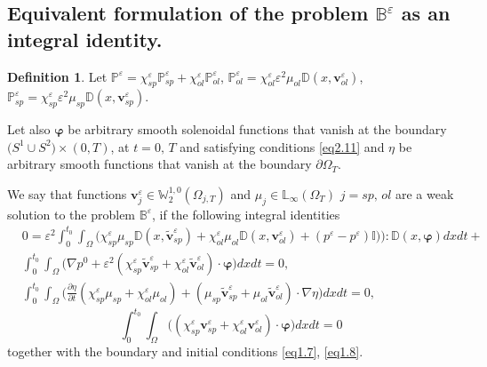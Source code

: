 \documentclass{article}
\theoremstyle{plain}
\theoremstyle{definition}
\newtheorem{definition}[theorem]{Definition}
\numberwithin{equation}{section}
\begin{document}
\subsection{Equivalent formulation of the problem $\mathbb{B}^{\varepsilon}$ as an integral identity.}

\begin{definition}\label{d2.14}
Let $\mathbb{P}^{\varepsilon}=\chi^{\varepsilon}_{sp}\mathbb{P}^{\varepsilon}_{sp}+
\chi^{\varepsilon}_{ol}\mathbb{P}^{\varepsilon}_{ol}$,
$\mathbb{P}^{\varepsilon}_{ol}=\chi^{\varepsilon}_{ol}\varepsilon^{2}\mu_{ol}
\mathbb{D}(x,\boldsymbol{v}^{\varepsilon}_{ol})$,
$\mathbb{P}^{\varepsilon}_{sp}=\chi^{\varepsilon}_{sp}\varepsilon^{2}\mu_{sp}
\mathbb{D}(x,\boldsymbol{v}^{\varepsilon}_{sp})$. 

Let also $\boldsymbol{\varphi}$ be arbitrary
smooth solenoidal functions that vanish at the boundary $\big(S^{1}\cup S^{2}\big)\times(0,T)$,
at $t=0,\,T$ and satisfying conditions \eqref{eq2.11} and $\eta$ be arbitrary smooth functions that
vanish at the boundary $\partial\Omega_{T}$.

We say that functions $\boldsymbol{v}^{\varepsilon}_{j}\in\mathbb{W}^{1,0}_{2}(\Omega_{j,T})$ 
and $\mu_{j}\in\mathbb{L}_{\infty}(\Omega_{T})\,\,j=sp,\,ol$ are a weak solution to the problem $\mathbb{B}^{\varepsilon}$, if the following integral identities
\begin{equation}\label{eq2.18}
\begin{aligned}
&
0=\varepsilon^{2}\int_{0}^{t_{0}}\int_{\Omega}\big(\chi^{\varepsilon}_{sp}\mu_{sp}
\mathbb{D}(x,\widetilde{\boldsymbol{v}}^{\varepsilon}_{sp})+
\chi^{\varepsilon}_{ol}\mu_{ol}\mathbb{D}(x,\boldsymbol{v}^{\varepsilon}_{ol})+
({p}^{\varepsilon}-{p}^{\varepsilon})\mathbb{I})\big):\mathbb{D}(x,\boldsymbol{\varphi})dxdt+
\\
& \int_{0}^{t_{0}}\int_{\Omega}\big(\nabla{p}^{0}+\varepsilon^{2}(\chi^{\varepsilon}_{sp}
\widetilde{\boldsymbol{v}}^{\varepsilon}_{sp}+\chi^{\varepsilon}_{ol}
\widetilde{\boldsymbol{v}}^{\varepsilon}_{ol})\cdot\boldsymbol{\varphi}\big)dxdt=0,
\\
& \int_{0}^{t_{0}}\int_{\Omega}\big(\frac{\partial\eta}{\partial{t}}
(\chi^{\varepsilon}_{sp}\mu_{sp}+\chi^{\varepsilon}_{ol}\mu_{ol})+
(\mu_{sp}\widetilde{\boldsymbol{v}}^{\varepsilon}_{sp}+
\mu_{ol}\widetilde{\boldsymbol{v}}^{\varepsilon}_{ol})\cdot\nabla\eta\big)dxdt=0,
\end{aligned}
\end{equation}
\begin{equation}\label{eq2.19}
\int_{0}^{t_{0}}\int_{\Omega}\big((\chi^{\varepsilon}_{sp}
\boldsymbol{v}^{\varepsilon}_{sp}+\chi^{\varepsilon}_{ol}
\boldsymbol{v}^{\varepsilon}_{ol})\cdot\boldsymbol{\varphi}\big)dxdt=0
\end{equation}
together with the boundary and initial conditions \eqref{eq1.7}, \eqref{eq1.8}.
\end{definition}
\end{document}
